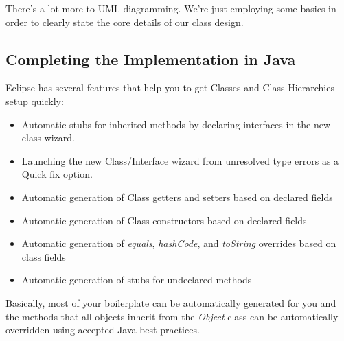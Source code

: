\documentclass[]{tufte-handout}
\begin{document}
There's a lot more to UML diagramming. We're just employing some basics in order to clearly state the core details of our class design. 

\subsection{Completing the Implementation in Java}

Eclipse has several features that help you to get Classes and Class Hierarchies setup quickly:
\begin{itemize}
\item Automatic stubs for inherited methods by declaring interfaces in the new class wizard.
\item Launching the new Class/Interface wizard from unresolved type errors as a Quick fix option.
\item Automatic generation of Class getters and setters based on declared fields
\item Automatic generation of Class constructors based on declared fields
\item Automatic generation of \textit{equals}, \textit{hashCode}, and \textit{toString} overrides based on class fields
\item Automatic generation of stubs for undeclared methods
\end{itemize}
Basically, most of your boilerplate can be automatically generated for you and the methods that all objects inherit from the \textit{Object} class can be automatically overridden using accepted Java best practices.  
\end{document}

